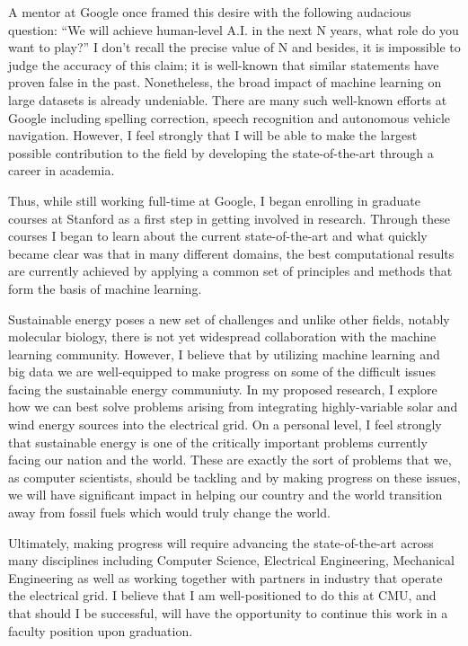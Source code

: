 \documentclass[12pt]{article}
\begin{document}
A mentor at Google once framed this desire with the following audacious question: ``We will achieve human-level A.I. in the next N years, what role do you want to play?'' I don't recall the precise value of N  and besides, it is impossible to judge the accuracy of this claim; it is well-known that similar statements have proven false in the past. Nonetheless, the broad impact of machine learning on large datasets is already undeniable. There are many such well-known efforts at Google including spelling correction, speech recognition and autonomous vehicle navigation. However, I feel strongly that I will be able to make the largest possible contribution to the field by developing the state-of-the-art through a career in academia.

Thus, while still working full-time at Google, I began enrolling in graduate courses at Stanford as a first step in getting involved in research. Through these courses I began to learn about the current state-of-the-art and what quickly became clear was that in many different domains, the best computational results are currently achieved by applying a common set of principles and methods that form the basis of machine learning.

Sustainable energy poses a new set of challenges and unlike other fields, notably molecular biology, there is not yet widespread collaboration with the machine learning community. However, I believe that by utilizing machine learning and big data we are well-equipped to make progress on some of the difficult issues facing the sustainable energy communiuty. In my proposed research, I explore how we can best solve problems arising from integrating highly-variable solar and wind energy sources into the electrical grid. On a personal level, I feel strongly that sustainable energy is one of the critically important problems currently facing our nation and the world. These are exactly the sort of problems that we, as computer scientists, should be tackling and by making progress on these issues, we will have significant impact in helping our country and the world transition away from fossil fuels which would truly change the world. 

Ultimately, making progress will require advancing the state-of-the-art across many disciplines including Computer Science, Electrical Engineering, Mechanical Engineering as well as working together with partners in industry that operate the electrical grid. I believe that I am well-positioned to do this at CMU, and that should I be successful, will have the opportunity to continue this work in a faculty position upon graduation.
\end{document}
